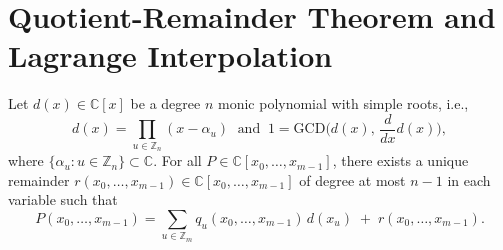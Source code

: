 \section{Quotient-Remainder Theorem and Lagrange Interpolation}\label{sec:QRT}
 \begin{proposition}\label{prop:multivariate-quotient-remainder}
Let $d(x)\in\mathbb{C}[x]$ be a degree $n$ monic polynomial with
simple roots, i.e.,
\begin{equation}
d(x)=\prod_{u\in\mathbb{Z}_{n}}(x-\alpha_{u})\;\text{ and }\:1=\text{GCD}\big(d(x),\,\frac{d}{dx}d(x)\big),
\end{equation}
where $\{\alpha_{u}:u\in\mathbb{Z}_{n}\}\subset\mathbb{C}$. 
For
all $P\in\mathbb{C}[x_{0},\ldots,x_{m-1}]$, there exists a unique remainder
$r(x_{0},\ldots,x_{m-1})\in\mathbb{C}[x_{0},\ldots,x_{m-1}]$ of degree
at most $n-1$ in each variable such that 
\begin{equation}
P(x_{0},\ldots,x_{m-1})=\sum_{u\in\mathbb{Z}_{m}}q_{u}(x_{0},\ldots,x_{m-1})\,d(x_{u}) \; + \; r(x_{0},\ldots,x_{m-1}).
\end{equation}
 \end{proposition}
